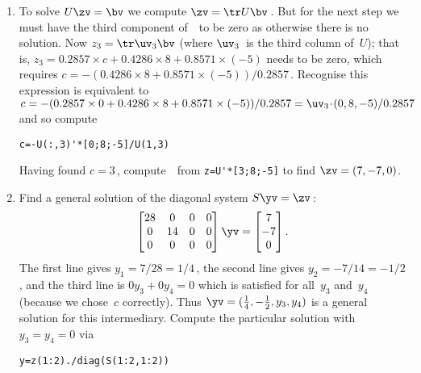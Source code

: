 \begin{example}
\begin{solution}
\begin{enumerate}
\item To solve \(U\zv=\bv\) we compute \(\zv=\tr U\bv\)\,.  
But for the next step we must have the third component of~\zv\ to be zero as otherwise there is no solution.  
Now \(z_3=\tr\uv_3\bv\) (where \(\uv_3\)~is the third column of~\(U\)); that is, \(z_3=0.2857\times c +0.4286\times8 +0.8571\times(-5)\) needs to be zero, which requires \(c=-(0.4286\times8 +0.8571\times(-5))/0.2857\)\,.  
Recognise this expression is equivalent to \(c=-(0.2857\times0+0.4286\times8 +0.8571\times(-5))/0.2857=\uv_3\cdot(0,8,-5)/0.2857\) and so compute
\begin{verbatim}
c=-U(:,3)'*[0;8;-5]/U(1,3)
\end{verbatim}
Having found \(c=3\)\,, compute~\zv\ from \verb|z=U'*[3;8;-5]| to find \(\zv=(7,-7,0)\).

\item Find a general solution of the diagonal system \(S\yv=\zv\)\,:
\begin{equation*}
\begin{bmatrix}28&0&0&0
\\0&14&0&0
\\0&0&0&0 \end{bmatrix}\yv=\begin{bmatrix} 7\\-7\\0 \end{bmatrix}.
\end{equation*}
The first line gives \(y_1=7/28=1/4\)\,, the second line gives \(y_2=-7/14=-1/2\), and the third line is \(0y_3+0y_4=0\) which is satisfied for all~\(y_3\) and~\(y_4\) (because we chose~\(c\) correctly).
Thus \(\yv=(\frac14,-\frac12,y_3,y_4)\) is a general solution for this intermediary.
Compute the particular solution with \(y_3=y_4=0\) via 
\begin{verbatim}
y=z(1:2)./diag(S(1:2,1:2))
\end{verbatim}


\end{enumerate}
\end{solution}
\end{example}
